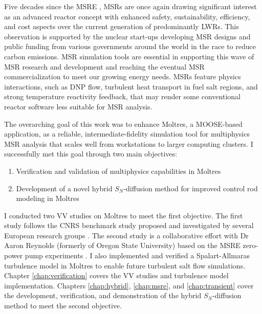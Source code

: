 Five decades since the \gls{MSRE} \cite{haubenreich_experience_1970}, \glspl{MSR} are once again
drawing significant interest as an advanced reactor concept with enhanced safety, sustainability,
efficiency, and cost aspects over the
current generation of predominantly \glspl{LWR}. This observation is supported by the
nuclear start-ups developing \gls{MSR} designs and public funding from various governments around
the world in the race to reduce carbon emissions. \gls{MSR} simulation tools are essential in
supporting this wave of \gls{MSR} research and development and reaching the eventual \gls{MSR}
commercialization to meet our growing energy needs.
\glspl{MSR} feature physics interactions, such as \gls{DNP} flow, turbulent heat transport in fuel
salt regions, and strong temperature reactivity feedback, that may render some conventional reactor
software less suitable for \gls{MSR} analysis.

The overarching goal of this work was to enhance Moltres, a \gls{MOOSE}-based application, as a
reliable, intermediate-fidelity simulation tool for multiphysics \gls{MSR} analysis that scales
well from workstations to larger computing clusters. I successfully met this goal through two main
objectives:
%
\begin{enumerate}
  \item Verification and validation of multiphysics capabilities in Moltres
  \item Development of a novel hybrid $S_N$-diffusion method for improved control rod modeling in
    Moltres
\end{enumerate}

I conducted two \gls{VV} studies on Moltres to meet the first objective.
The first study follows the CNRS benchmark
study proposed and investigated by several European research groups \cite{tiberga_results_2020}.
The second study is a collaborative effort with Dr Aaron Reynolds (formerly of Oregon State
University) based on the \gls{MSRE} zero-power pump experiments \cite{prince_zero-power_1968}.
I also implemented and verified a Spalart-Allmaras turbulence model in Moltres to enable future
turbulent salt flow simulations. Chapter \ref{chap:verification} covers the \gls{VV} studies and
turbulence model implementation. Chapters \ref{chap:hybrid}, \ref{chap:msre}, and
\ref{chap:transient} cover the development, verification, and demonstration of the hybrid
$S_N$-diffusion method to meet the second objective.

